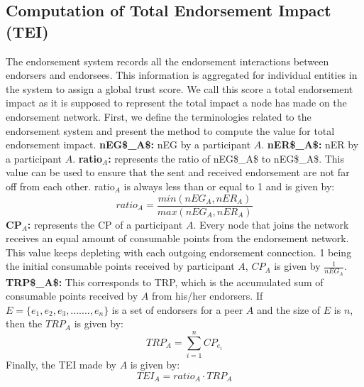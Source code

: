 \subsection{Computation of Total Endorsement Impact (TEI)} 
The endorsement system records all the endorsement interactions between
endorsers and endorsees. This information is aggregated for individual entities
in the system to assign a global trust score. We call this score a total
endorsement impact as it is supposed to represent the total impact a node has
made on the endorsement network. First, we define the terminologies related to
the endorsement system and present the method to compute the value for total
endorsement impact.\newline 
\textbf{{\acrshort{nEG$_A$:}}} \ac{nEG} by a participant $A$. \newline
\textbf{{\acrshort{nER$_A$:}}} \ac{nER} by a participant $A$. \newline
\textbf{ratio$_A$:} represents the ratio of \acrshort{nEG$_A$} to
\acrshort{nEG$_A$}. This value can be used to ensure that the sent and received
endorsement are not far off from each other. ratio$_{A}$ is always less than or
equal to 1 and is given by:   
\begin{equation}
	ratio_A = \frac{min(nEG_A, nER_A)}{max(nEG_A, nER_A)}
\end{equation}
\textbf{\acrshort{CP}$_A$:} represents the \ac{CP} of a participant $A$. Every
node that joins the network receives an equal amount of consumable points from
the endorsement network. This value keeps depleting with each outgoing
endorsement connection. 1 being the initial consumable points received by
participant $A$, $CP_{A}$ is given by $\frac{1}{nEG_A}$.\newline
\textbf{\acrshort{TRP$_A$}:} This corresponds to \ac{TRP}, which is the
accumulated sum of consumable points received by $A$ from his/her endorsers.
\newline
If $E = \{e_{1}, e_{2}, e_{3}, ......., e_{n}\}$ is a set of endorsers for a
peer $A$ and the size of $E$ is $n$, then the $TRP_{A}$ is given by:
\begin{equation}
	TRP_A = \sum_{i=1}^{n}CP_{e_{i}}
\end{equation}
Finally, the \ac{TEI} made by $A$ is given by: 
\begin{equation}
	TEI_A = ratio_A \cdot TRP_A
\end{equation}

